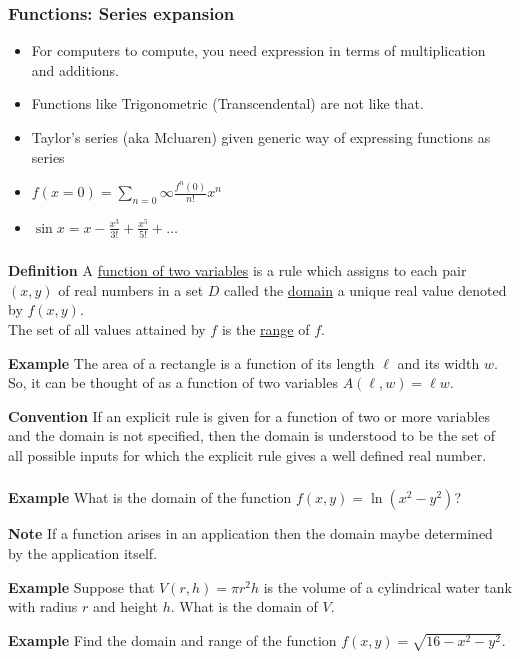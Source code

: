  \begin{frame}[fragile]\frametitle{Functions: Series expansion}
\begin{itemize}
\item For computers to compute, you need expression in terms of multiplication and additions.
\item Functions like Trigonometric (Transcendental) are not like that.
\item Taylor's series (aka Mcluaren) given generic way of expressing functions as series
\item $f(x=0) = \sum_{n=0}{\infty} \frac{f^n(0)}{n!} x^n$
\item $\sin x = x - \frac{x^3}{3!} + \frac{x^5}{5!} + \ldots$
\end{itemize}
\end{frame}

\begin{frame}[fragile]\frametitle{}
\textbf{Definition}
A \underline{function of two variables} is a rule which assigns to each pair $(x,y)$ of real numbers in a set $D$ called the \underline{domain} a unique real value denoted by $f(x,y)$.  \\ 
The set of all values attained by $f$ is the \underline{range} of $f$.
 

\textbf{Example}
The area of a rectangle is a function of its length $\ell$ and its width $w$.  So, it can be thought of as a function of two variables $A(\ell,w)=\ell w$.
 

\textbf{Convention}  
If an explicit rule is given for a function of two or more variables and the domain is not specified, then the domain is understood to be the set of all possible inputs for which the explicit rule gives a well defined real number.

\end{frame}



\begin{frame}[fragile]\frametitle{}

\textbf{Example}
What is the domain of the function $f(x,y)=\ln(x^2-y^2)$?
  

\textbf{Note}
If a function arises in an application then the domain maybe determined by the application itself.
  

\textbf{Example}
Suppose that $V(r,h)=\pi r^2h$ is the volume of a cylindrical water tank with radius $r$ and height $h$.  What is the domain of $V$.


\textbf{Example}
Find the domain and range of the function $f(x,y)= \sqrt{16-x^2-y^2}$.


\end{frame}

